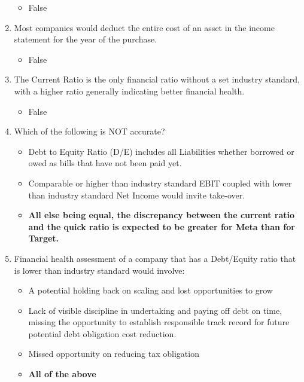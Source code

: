 \begin{scriptsize}
\begin{enumerate}[itemsep=0em]
          \begin{itemize}[itemsep=0em]
            \item False
          \end{itemize}
    \item Most companies would deduct the entire cost of an asset in the income statement for the year of the purchase.
          \begin{itemize}[itemsep=0em]
            \item False
          \end{itemize}
    \item The Current Ratio is the only financial ratio without a set industry standard, with a higher ratio generally indicating better financial health.
          \begin{itemize}[itemsep=0em]
            \item False
          \end{itemize}
    \item Which of the following is NOT accurate?
          \begin{itemize}[itemsep=0em]
            \item Debt to Equity Ratio (D/E) includes all Liabilities whether borrowed or owed as bills that have not been paid yet.
            \item Comparable or higher than industry standard EBIT coupled with lower than industry standard Net Income would invite take-over.
            \item \textbf{All else being equal, the discrepancy between the current ratio and the quick ratio is expected to be greater for Meta than for Target.}
          \end{itemize}
    \item Financial health assessment of a company that has a Debt/Equity ratio that is lower than industry standard would involve:
          \begin{itemize}[itemsep=0em]
            \item A potential holding back on scaling and lost opportunities to grow
            \item Lack of visible discipline in undertaking and paying off debt on time, missing the opportunity to establish responsible track record for future potential debt obligation cost reduction.
            \item Missed opportunity on reducing tax obligation
            \item \textbf{All of the above}
          \end{itemize}

\end{enumerate}
\end{scriptsize}
